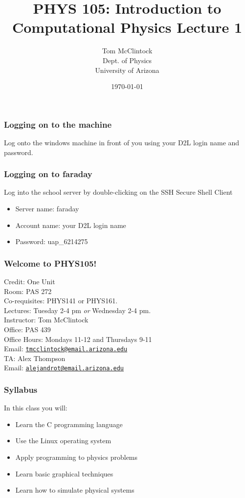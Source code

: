 \documentclass{beamer}
\title{PHYS 105: Introduction to Computational Physics Lecture 1}
\author{Tom McClintock \\
	Dept. of Physics\\
	University of Arizona
}
\date{\today}
\begin{document}
\begin{frame}
  \titlepage
\end{frame}

\begin{frame}
  \frametitle{Logging on to the machine}
  Log onto the windows machine in front of you using your D2L login name 
  and password.
\end{frame}

\begin{frame}
  \frametitle{Logging on to faraday}
  Log into the school server by double-clicking on the SSH Secure Shell Client
  \begin{itemize}
  \item Server name: faraday
  \item Account name: your D2L login name
  \item Password: uap\_6214275
  \end{itemize}
\end{frame}

\begin{frame}
  \frametitle{Welcome to PHYS105!}
  Credit: One Unit\\
  Room: PAS 272\\
  Co-requisites: PHYS141 or PHYS161.\\
  Lectures: Tuesday 2-4 pm {\it or} Wednesday 2-4 pm.\\
  \vspace{12pt}
  Instructor: Tom McClintock\\
  Office: PAS 439\\
  Office Hours: Mondays 11-12 and Thursdays 9-11\\
  Email: \href{mailto:tmcclintock@email.arizona.edu}{\nolinkurl{tmcclintock@email.arizona.edu}}\\
  \vspace{12pt}
  TA: Alex Thompson\\
  Email: \href{mailto:alejandrot@email.arizona.edu}{\nolinkurl{alejandrot@email.arizona.edu}}
\end{frame}

\begin{frame}
  \frametitle{Syllabus}
  In this class you will:
  \begin{itemize}
  \item Learn the C programming language
  \item Use the Linux operating system
  \item Apply programming to physics problems
  \item Learn basic graphical techniques
  \item Learn how to simulate physical systems
  \end{itemize}
\end{frame}
\end{document}
